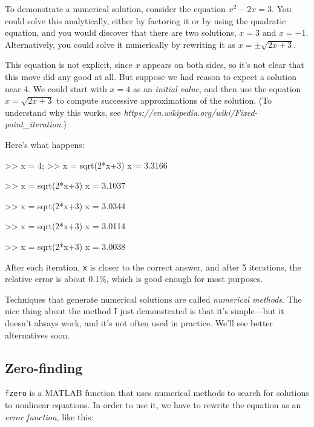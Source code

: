 
To demonstrate a numerical solution, consider the equation $x^2 - 2x =
3$.  You could solve this analytically, either by factoring it or by
using the quadratic equation, and you would discover that there are
two solutions, $x=3$ and $x=-1$.  Alternatively, you could solve it
numerically by rewriting it as $x = \pm \sqrt{2x+3}$.

This equation is not explicit, since $x$ appears on both sides, so
it's not clear that this move did any good at all.  But suppose we had
reason to expect a solution near 4.
We could start with $x=4$ as an {\em initial value}, and then use
the equation $x = \sqrt{2x+3}$ to compute successive
approximations of the solution. (To understand why this
works, see \emph{https://en.wikipedia.org/wiki/Fixed-point\_iteration}.)


Here's what happens:

\begin{code}
>> x = 4;
>> x = sqrt(2*x+3)
x = 3.3166

>> x = sqrt(2*x+3)
x = 3.1037

>> x = sqrt(2*x+3)
x = 3.0344

>> x = sqrt(2*x+3)
x = 3.0114

>> x = sqrt(2*x+3)
x = 3.0038
\end{code}

After each iteration, {\tt x} is closer to the correct answer,
and after 5 iterations, the relative error is about 0.1\%, which
is good enough for most purposes.


Techniques that generate numerical solutions are called
\emph{numerical methods}.  
The nice thing about the method I
just demonstrated is that it's simple---but it doesn't always
work, and it's not often used in practice.
We'll see better alternatives soon.

\subsection{Zero-finding}
\label{zero}


{\tt fzero} is a MATLAB function that uses numerical methods to search for solutions to nonlinear equations.  In order to use it, we have to rewrite the equation as an {\em error function}, like this:

